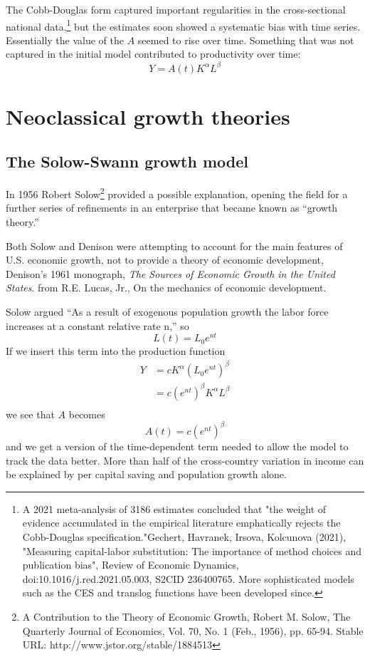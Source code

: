 The Cobb-Douglas form captured  important regularities in the cross-sectional national data,\footnote{ A 2021 meta-analysis of 3186 estimates concluded that "the weight of evidence accumulated in the empirical literature emphatically rejects the Cobb-Douglas specification."Gechert, Havranek, Irsova, Kolcunova (2021), "Measuring capital-labor substitution: The importance of method choices and publication bias", Review of Economic Dynamics, doi:10.1016/j.red.2021.05.003, S2CID 236400765. More sophisticated models  such as the CES and translog functions have been developed  since.} 
but the estimates soon showed a systematic bias with time series. Essentially the value of the $A$ seemed to rise over time. Something that was not captured in the initial model  contributed to productivity over time: 
 \[Y=A(t)K^\alpha L^\beta\]

  \section{Neoclassical growth theories}  

 \subsection{The Solow-Swann growth model}
In 1956 Robert Solow\footnote{A Contribution to the Theory of Economic Growth,  Robert M. Solow, The Quarterly Journal of Economics, Vol. 70, No. 1 (Feb., 1956), pp. 65-94. Stable URL: http://www.jstor.org/stable/1884513} provided a possible explanation, opening the field for a further series of refinements in an enterprise that became known as ``growth theory.'' 

{\color{blue}  Both Solow and Denison were attempting to account for the main features of U.S. economic growth, not to provide a theory of economic development,  Denison's 1961 monograph, \textit{The Sources of Economic Growth in the United States}.  from R.E. Lucas, Jr., On the mechanics of economic development.}

Solow argued ``As a result of exogenous population growth the labor force increases at a constant relative rate n,'' so
  \[L(t)= L_0e^{nt}\] 
If we insert this term into the production function 
 \begin{eqnarray}
 Y&=cK^\alpha (L_0e^{nt})^\beta\\
    &=c(e^{nt})^{\beta}K^\alpha L^\beta\\
 \end{eqnarray}
we see that $A$ becomes
 \[A(t)=c(e^{nt})^\beta\]
and we get a version of the time-dependent term needed to  allow the model to track the data better. More than half  of the cross-country variation in income can be explained by per capital saving and population growth alone.



